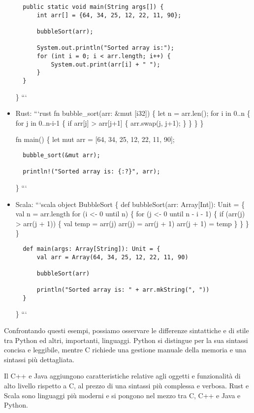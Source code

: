 \documentclass[
  letterpaper,
]{scrbook}
\begin{document}
\begin{itemize}
\begin{verbatim}
  public static void main(String args[]) {
      int arr[] = {64, 34, 25, 12, 22, 11, 90};

      bubbleSort(arr);

      System.out.println("Sorted array is:");
      for (int i = 0; i < arr.length; i++) {
          System.out.print(arr[i] + " ");
      }
  }
\end{verbatim}

  \} ```
\item
  Rust: ```rust fn bubble\_sort(arr: \&mut {[}i32{]}) \{ let n =
  arr.len(); for i in 0..n \{ for j in 0..n-i-1 \{ if arr{[}j{]}
  \textgreater{} arr{[}j+1{]} \{ arr.swap(j, j+1); \} \} \} \}

  fn main() \{ let mut arr = {[}64, 34, 25, 12, 22, 11, 90{]};

\begin{verbatim}
  bubble_sort(&mut arr);

  println!("Sorted array is: {:?}", arr);
\end{verbatim}

  \} ```
\item
  Scala: ```scala object BubbleSort \{ def bubbleSort(arr:
  Array{[}Int{]}): Unit = \{ val n = arr.length for (i \textless- 0
  until n) \{ for (j \textless- 0 until n - i - 1) \{ if (arr(j)
  \textgreater{} arr(j + 1)) \{ val temp = arr(j) arr(j) = arr(j + 1)
  arr(j + 1) = temp \} \} \} \}

\begin{verbatim}
  def main(args: Array[String]): Unit = {
      val arr = Array(64, 34, 25, 12, 22, 11, 90)

      bubbleSort(arr)

      println("Sorted array is: " + arr.mkString(", "))
  }
\end{verbatim}

  \} ```
\end{itemize}

Confrontando questi esempi, possiamo osservare le differenze sintattiche
e di stile tra Python ed altri, importanti, linguaggi. Python si
distingue per la sua sintassi concisa e leggibile, mentre C richiede una
gestione manuale della memoria e una sintassi più dettagliata.

Il C++ e Java aggiungono caratteristiche relative agli oggetti e
funzionalità di alto livello rispetto a C, al prezzo di una sintassi più
complessa e verbosa. Rust e Scala sono linguaggi più moderni e si
pongono nel mezzo tra C, C++ e Java e Python.
\end{document}
